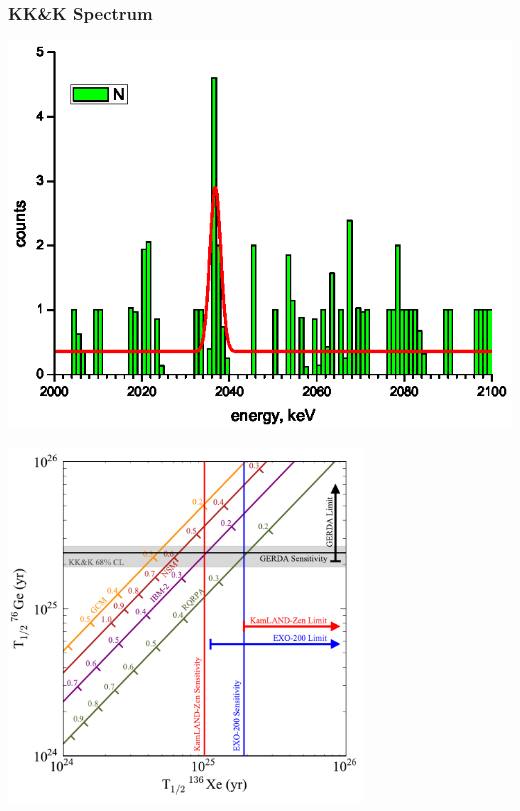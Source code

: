 \documentclass{beamer}
\begin{document}
\begin{frame}
\begin{center}
\frametitle{KK\&K Spectrum}
\end{center}
\begin{center}
\includegraphics[keepaspectratio=true,width=\textwidth]{KKandKClaim.eps}
\end{center}
\end{frame}

\begin{frame}
\begin{center}
\includegraphics[keepaspectratio=true,width=3.7in]{MatplotLibSensitivity_withClaim.pdf}
\end{center}
\end{frame}
\end{document}
